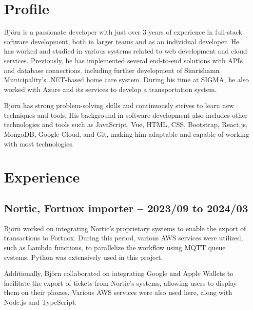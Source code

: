 \documentclass{article}
\begin{document}
	\noindent
	\begin{minipage}[t]{0.7\textwidth}
		\vspace{-20pt} %
		\section*{\textcolor{colorBlue}{Profile}}
		Björn is a passionate developer with just over 3 years of experience in full-stack software development, both in larger teams and as an individual developer. He has worked and studied in various systems related to web development and cloud services. Previously, he has implemented several end-to-end solutions with APIs and database connections, including further development of Simrishamn Municipality's .NET-based home care system. During his time at SIGMA, he also worked with Azure and its services to develop a transportation system.
		
		\vspace{10pt}
		Björn has strong problem-solving skills and continuously strives to learn new techniques and tools. His background in software development also includes other technologies and tools such as JavaScript, Vue, HTML, CSS, Bootstrap, React.js, MongoDB, Google Cloud, and Git, making him adaptable and capable of working with most technologies.
		
		\vspace{10pt} %
		\section*{\textcolor{colorBlue}{Experience}}
		
		\subsection*{\textcolor{colorTitelErfarenhet}{Nortic, Fortnox importer – 2023/09 to 2024/03}}
		Björn worked on integrating Nortic's proprietary systems to enable the export of transactions to Fortnox. During this period, various AWS services were utilized, such as Lambda functions, to parallelize the workflow using MQTT queue systems. Python was extensively used in this project.
		
		Additionally, Björn collaborated on integrating Google and Apple Wallets to facilitate the export of tickets from Nortic's systems, allowing users to display them on their phones. Various AWS services were also used here, along with Node.js and TypeScript.
		

\end{minipage}
\end{document}
